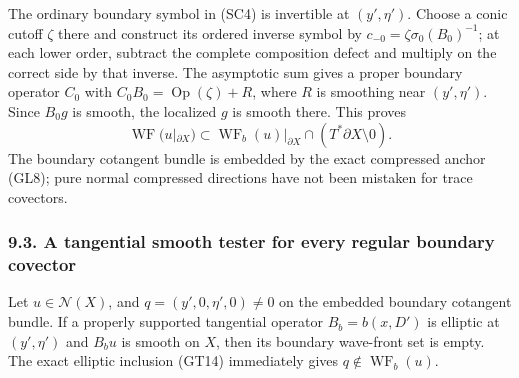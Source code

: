 \documentclass[
  11pt,
]{article}
\begin{document}
The ordinary boundary symbol in (SC4) is invertible at \((y',\eta')\).
Choose a conic cutoff \(\zeta\) there and construct its ordered inverse
symbol by \(c_{-0}=\zeta\sigma_0(B_0)^{-1}\); at each lower order,
subtract the complete composition defect and multiply on the correct
side by that inverse. The asymptotic sum gives a proper boundary
operator \(C_0\) with \(C_0B_0=\operatorname{Op}(\zeta)+R\), where \(R\)
is smoothing near \((y',\eta')\). Since \(B_0g\) is smooth, the
localized \(g\) is smooth there. This proves \[
 \operatorname{WF}(u|_{\partial X})
   \subset
 \operatorname{WF}_b(u)|_{\partial X}
          \cap(T^*\partial X\setminus0).
 \tag{SC5}
\] The boundary cotangent bundle is embedded by the exact compressed
anchor (GL8); pure normal compressed directions have not been mistaken
for trace covectors.

\subsubsection{9.3. A tangential smooth tester for every regular
boundary
covector}\label{a-tangential-smooth-tester-for-every-regular-boundary-covector}

Let \(u\in\mathcal N(X)\), and \(q=(y',0,\eta',0)\ne0\) on the embedded
boundary cotangent bundle. If a properly supported tangential operator
\(B_b=b(x,D')\) is elliptic at \((y',\eta')\) and \(B_bu\) is smooth on
\(X\), then its boundary wave-front set is empty. The exact elliptic
inclusion (GT14) immediately gives \(q\notin\operatorname{WF}_b(u)\).
\end{document}

